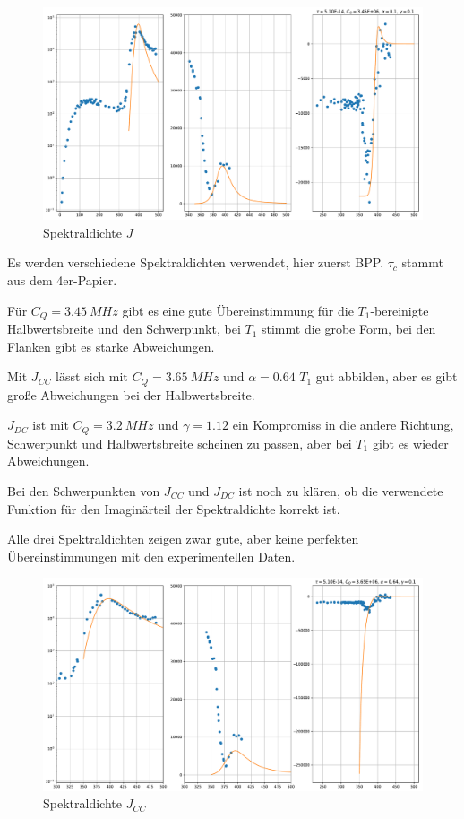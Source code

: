 \begin{figure}
	\begin{center}
		\includegraphics[width=\textwidth]{graphics/plots/THEO/J_01.pdf}
	\end{center}
	\caption{Spektraldichte $J$} \label{fig:res:theorie_j}
\end{figure}
Es werden verschiedene Spektraldichten verwendet, hier zuerst BPP. $\tau_c$ stammt aus dem 4er-Papier.

Für $C_Q = \SI{3.45}{MHz}$ gibt es eine gute Übereinstimmung für die $T_1$-bereinigte Halbwertsbreite und den Schwerpunkt, bei $T_1$ stimmt die grobe Form, bei den Flanken gibt es starke Abweichungen.

Mit $J_{CC}$ lässt sich mit $C_Q = \SI{3.65}{MHz}$ und $\alpha = 0.64$ $T_1$ gut abbilden, aber es gibt große Abweichungen bei der Halbwertsbreite. 

$J_{DC}$ ist mit $C_Q = \SI{3.2}{MHz}$ und $\gamma = 1.12$ ein Kompromiss in die andere Richtung, Schwerpunkt und Halbwertsbreite scheinen zu passen, aber bei $T_1$ gibt es wieder Abweichungen. 

Bei den Schwerpunkten von $J_{CC}$ und $J_{DC}$ ist noch zu klären, ob die verwendete Funktion für den Imaginärteil der Spektraldichte korrekt ist.

Alle drei Spektraldichten zeigen zwar gute, aber keine perfekten Übereinstimmungen mit den experimentellen Daten.



\begin{figure}
	\begin{center}
		\includegraphics[width=\textwidth]{graphics/plots/THEO/J_cc_02.pdf}
	\end{center}
	\caption{Spektraldichte $J_{CC}$} \label{fig:res:theorie_j_cc}
\end{figure}

